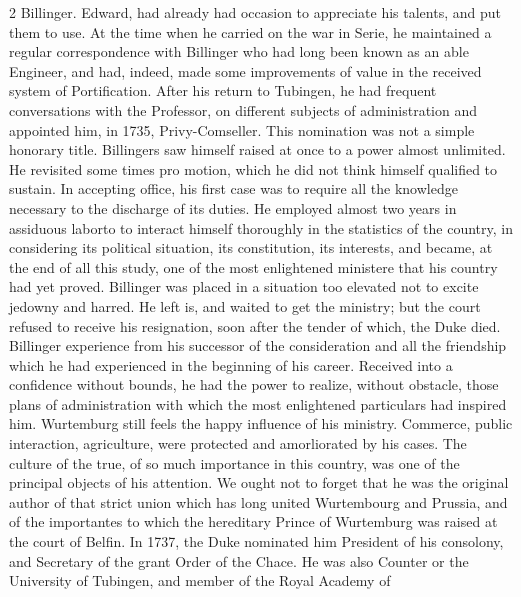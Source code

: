 \documentclass[10pt]{article}
\begin{document}
\begin{multicols}{2}\raggedcolumns
Billinger. Edward, had already had occasion to appreciate his talents, and put them to use. At the time when he carried on the war in Serie, he maintained a regular correspondence with Billinger who had long been known as an able Engineer, and had, indeed, made some improvements of value in the received system of Portification. After his return to Tubingen, he had frequent conversations with the Professor, on different subjects of administration and appointed him, in 1735, Privy-Comseller. This nomination was not a simple honorary title. Billingers saw himself raised at once to a power almost unlimited. He revisited some times pro motion, which he did not think himself qualified to sustain. In accepting office, his first case was to require all the knowledge necessary to the discharge of its duties. He employed almost two years in assiduous laborto to interact himself thoroughly in the statistics of the country, in considering its political situation, its constitution, its interests, and became, at the end of all this study, one of the most enlightened ministere that his country had yet proved. Billinger was placed in a situation too elevated not to excite jedowny and harred. He left is, and waited to get the ministry; but the court refused to receive his resignation, soon after the tender of which, the Duke died. Billinger experience from his successor of the consideration and all the friendship which he had experienced in the beginning of his career. Received into a confidence without bounds, he had the power to realize, without obstacle, those plans of administration with which the most enlightened particulars had inspired him. Wurtemburg still feels the happy influence of his ministry. Commerce, public interaction, agriculture, were protected and amorliorated by his cases. The culture of the true, of so much importance in this country, was one of the principal objects of his attention. We ought not to forget that he was the original author of that strict union which has long united Wurtembourg and Prussia, and of the importantes to which the hereditary Prince of Wurtemburg was raised at the court of Belfin. In 1737, the Duke nominated him President of his consolony, and Secretary of the grant Order of the Chace. He was also Counter or the University of Tubingen, and member of the Royal Academy of


\end{multicols}
\end{document}
